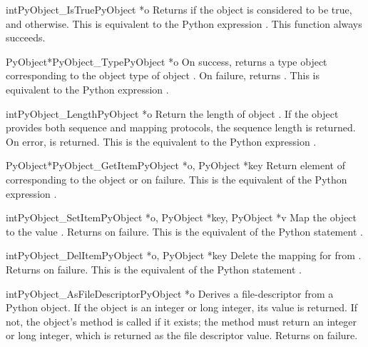 \documentclass{manual}
\begin{document}
\begin{cfuncdesc}{int}{PyObject_IsTrue}{PyObject *o}
Returns  if the object  is considered to be true, and
 otherwise. This is equivalent to the Python expression
.
This function always succeeds.
\end{cfuncdesc}


\begin{cfuncdesc}{PyObject*}{PyObject_Type}{PyObject *o}
On success, returns a type object corresponding to the object
type of object . On failure, returns \NULL{}.  This is
equivalent to the Python expression .
\end{cfuncdesc}

\begin{cfuncdesc}{int}{PyObject_Length}{PyObject *o}
Return the length of object .  If the object  provides
both sequence and mapping protocols, the sequence length is
returned.  On error,  is returned.  This is the equivalent
to the Python expression .
\end{cfuncdesc}


\begin{cfuncdesc}{PyObject*}{PyObject_GetItem}{PyObject *o, PyObject *key}
Return element of  corresponding to the object  or
\NULL{} on failure. This is the equivalent of the Python expression
.
\end{cfuncdesc}


\begin{cfuncdesc}{int}{PyObject_SetItem}{PyObject *o, PyObject *key, PyObject *v}
Map the object  to the value .
Returns  on failure.  This is the equivalent
of the Python statement .
\end{cfuncdesc}


\begin{cfuncdesc}{int}{PyObject_DelItem}{PyObject *o, PyObject *key}
Delete the mapping for  from .  Returns  on
failure. This is the equivalent of the Python statement .
\end{cfuncdesc}

\begin{cfuncdesc}{int}{PyObject_AsFileDescriptor}{PyObject *o}
Derives a file-descriptor from a Python object.  If the object
is an integer or long integer, its value is returned.  If not, the
object's  method is called if it exists; the method
must return an integer or long integer, which is returned as the file
descriptor value.  Returns  on failure.
\end{cfuncdesc}
\end{document}
